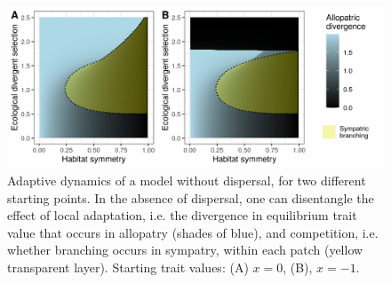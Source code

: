 \begin{figure}
    \centering
    \includegraphics[width=\textwidth]{figures/divergence_across_patches}
    \caption{Adaptive dynamics of a model without dispersal, for two different starting points. In the absence of dispersal, one can disentangle the effect of local adaptation, i.e. the divergence in equilibrium trait value that occurs in allopatry (shades of blue), and competition, i.e. whether branching occurs in sympatry, within each patch (yellow transparent layer). Starting trait values: (A) $x = 0$, (B), $x = -1$.}
    \label{fig:map_divergence}
\end{figure}